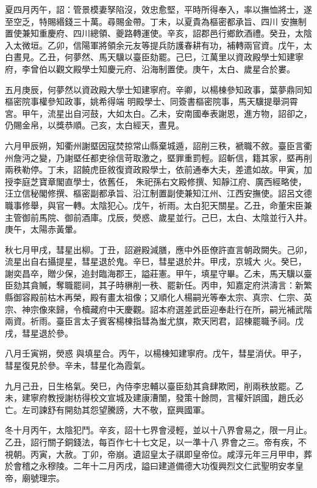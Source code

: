 \begin{pinyinscope}
 夏四月丙午，詔：管景模妻孥陷沒，效忠愈堅，平時所得奉入，率以撫恤將士，遂至空乏，特賜緡錢三十萬。尋賜金帶。丁未，以夏貴為樞密都承旨、四川
 安撫制置使兼知重慶府、四川總領、夔路轉運使。辛亥，詔郡邑行鄉飲酒禮。癸丑，太陰入太微垣。乙卯，信陽軍將領余元友等提兵防護春耕有功，補轉兩官資。戊午，太白晝見。乙丑，何夢然、馬天驥以臺臣劾罷。己巳，江萬里以資政殿學士知建寧府，李曾伯以觀文殿學士知慶元府、沿海制置使。庚午，太白、歲星合於婁。



 五月庚辰，何夢然以資政殿大學士知建寧府。辛卿，以楊棟參知政事，葉夢鼎同知樞密院事權參知政事，姚希得端
 明殿學士、同簽書樞密院事，馬天驥提舉洞霄宮。甲午，流星出自河鼓，大如太白。乙未，安南國奉表謝恩，進方物，詔卻之，仍賜金帛，以獎恭順。己亥，太白經天，晝見。



 六月甲辰朔，知衢州謝塈因寇焚掠常山縣棄城遁，詔削三秩，褫職不敘。臺臣言衢州詹沔之變，乃謝塈任都吏徐信苛取激之，塈罪重罰輕。詔斬信，籍其家，塈再削兩秩勒停。丁未，詔饒虎臣敘復資政殿學士，依前通奉大夫，差遣如故。甲寅，加授李庭芝寶章閣直學士，依舊任，
 朱祀孫右文殿修撰、知靜江府、廣西經略使，汪立信秘閣修撰、樞密副都承旨、沿江制置副使兼知江州、江西安撫使。詔呂文德職事修舉，與官一轉。太陰犯心。戊午，祈雨。太白犯天關星。乙丑，命董宋臣兼主管御前馬院、御前酒庫。戊辰，熒惑、歲星並行。己巳，太白、太陰並行入井。庚午，太陽赤黃暈。



 秋七月甲戌，彗星出柳。丁丑，詔避殿減膳，應中外臣僚許直言朝政闕失。己卯，流星出自右攝提星，彗星退於鬼。辛巳，彗星退於井。甲戌，京城大
 火。癸巳，謝奕昌卒，贈少保，追封臨海郡王，謚莊憲。甲午，填星守畢。乙未，馬天驥以臺臣劾其貪贓，奪職罷祠，其子時楙削一秩、罷新任。丙申，知嘉定府洪濤言：新繁縣御容殿前枯木再榮，殿有畫太祖像；又順化人楊嗣光等奉太宗、真宗、仁宗、英宗、神宗像來歸，令櫝藏府中天慶觀。詔本府選差武臣迎奉赴行在所，嗣光補武階兩資。祈雨。臺臣言太子賓客楊棟指彗為蚩尤旗，欺天罔君，詔棟罷職予祠。戊戌，彗星退於參。



 八月壬寅朔，熒惑
 與填星合。丙午，以楊棟知建寧府。戊午，彗星消伏。甲子，彗星復見於參。辛未，彗星化為霞氣。



 九月己丑，日生格氣。癸巳，內侍李忠輔以臺臣劾其貪肆欺罔，削兩秩放罷。乙未，建寧府教授謝枋得校文宣城及建康漕闈，發策十餘問，言權奸誤國，趙氏必亡。左司諫舒有開劾其怨望騰謗，大不敬，竄興國軍。



 冬十月丙午，太陰犯鬥。辛亥，詔十七界會浸輕，並以十八界會易之，限一月止。乙丑，詔行關子銅錢法，每百作七十七文足，以一準十八
 界會之三。帝有疾，不視朝。丙寅，大赦。丁卯，帝崩。遺詔皇太子祺即皇帝位。咸淳元年三月甲申，葬於會稽之永穆陵。二年十二月丙戌，謚曰建道備德大功復興烈文仁武聖明安孝皇帝，廟號理宗。




\end{pinyinscope}

